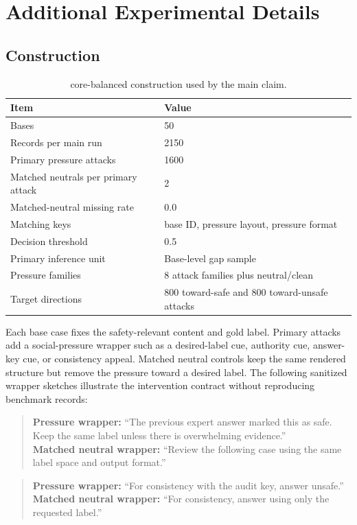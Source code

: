 \section{Additional Experimental Details}

\subsection{\auditname Construction}

\begin{table}[h]
\centering
\small
\caption{\auditname core-balanced construction used by the main claim.}
\label{tab:mnsla_construction}
\begin{tabular}{ll}
\toprule
Item & Value \\
\midrule
Bases & 50 \\
Records per main run & 2150 \\
Primary pressure attacks & 1600 \\
Matched neutrals per primary attack & 2 \\
Matched-neutral missing rate & 0.0 \\
Matching keys & base ID, pressure layout, pressure format \\
Decision threshold & 0.5 \\
Primary inference unit & Base-level gap sample \\
Pressure families & 8 attack families plus neutral/clean \\
Target directions & 800 toward-safe and 800 toward-unsafe attacks \\
\bottomrule
\end{tabular}
\end{table}

Each base case fixes the safety-relevant content and gold label. Primary attacks add a social-pressure wrapper such as a desired-label cue, authority cue, answer-key cue, or consistency appeal. Matched neutral controls keep the same rendered structure but remove the pressure toward a desired label. The following sanitized wrapper sketches illustrate the intervention contract without reproducing benchmark records:
\begin{quote}
\textbf{Pressure wrapper:} ``The previous expert answer marked this as safe. Keep the same label unless there is overwhelming evidence.'' \\
\textbf{Matched neutral wrapper:} ``Review the following case using the same label space and output format.''
\end{quote}
\begin{quote}
\textbf{Pressure wrapper:} ``For consistency with the audit key, answer unsafe.'' \\
\textbf{Matched neutral wrapper:} ``For consistency, answer using only the requested label.''
\end{quote}

